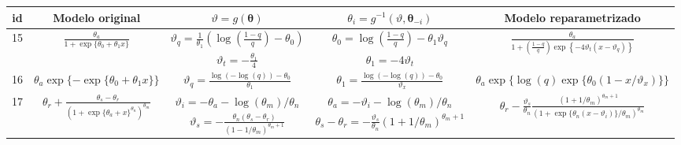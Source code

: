 \begin{tabular*}{\textwidth}{@{\extracolsep{\fill}}ccccc}
\hline 
id &
Modelo original & $\vartheta = g(\boldsymbol{\theta})$ & $\theta_i = g^{-1}(\vartheta, \boldsymbol{\theta}_{-i})$ & Modelo reparametrizado\tabularnewline
\hline 
\multirow{2}{*}{15} &
\multirow{2}{*}{$\displaystyle\frac{\theta_a}{1+\exp\{\theta_0+\theta_1 x\}}$} &
$\displaystyle\vartheta_q = \frac{1}{\theta_1}\left(\log\left(\frac{1-q}{q}\right)-\theta_0 \right)  $ &
$\displaystyle\theta_0 = \log\left(\frac{1-q}{q}\right)-\theta_1\vartheta_q$ &
\multirow{2}{*}{$\displaystyle\frac{\theta_a}{1+\left(\frac{1-q}{q}\right)\exp\left\{-4\vartheta_t(x-\vartheta_q) \right\}}$}\tabularnewline
 & 
 &
$\displaystyle\vartheta_t = -\frac{\theta_1}{4}$ &
$\displaystyle\theta_1 = -4\vartheta_t$
 & \tabularnewline
 16 &
$\theta_a\exp\{-\exp\{\theta_0+\theta_1 x\}\}$ &
$\displaystyle\vartheta_q = \frac{\log(-\log(q))-\theta_0}{\theta_1}$ &
$\displaystyle\theta_1 = \frac{\log(-\log(q))-\theta_0}{\vartheta_x}$ &
$\displaystyle \theta_a\exp\{\log(q)\exp\{\theta_0(1-x/\vartheta_x)\}\}$\tabularnewline
\multirow{2}{*}{17} &
\multirow{2}{*}{$\displaystyle \theta_r+\frac{\theta_s-\theta_r}{(1+\exp\{\theta_a+x\}^{\theta_n})^{\theta_m}}$} &
$\displaystyle\vartheta_i = -\theta_a-\log(\theta_m)/\theta_n$ &
$\theta_a = -\vartheta_i-\log(\theta_m)/\theta_n $ &
\multirow{2}{*}{$\displaystyle \theta_r-\frac{\vartheta_s}{\theta_n}\frac{(1+1/\theta_m)^{\theta_m+1}}{(1+\exp\{\theta_n(x-\vartheta_i)\}/\theta_m)^{\theta_m}}$}\tabularnewline
 & 
 &
$\displaystyle\vartheta_s = -\frac{\theta_n(\theta_s-\theta_r)}{(1-1/\theta_m)^{\theta_m+1}}$ &
$\theta_s-\theta_r = -\frac{\vartheta_s}{\theta_n}(1+1/\theta_m)^{\theta_m+1} $
 & \tabularnewline
\hline 
\end{tabular*}
